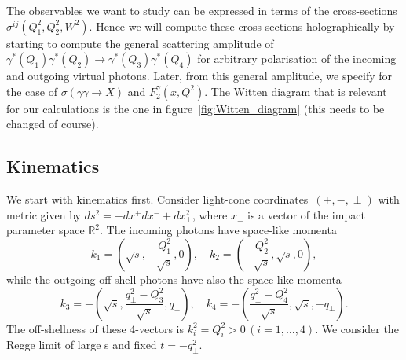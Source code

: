 \documentclass[preprint, 12pt]{elsarticle}
\begin{document}
The observables we want to study can be expressed in terms of the cross-sections $\sigma^{ij}\left(Q_1^2, Q_2^2, W^2\right)$. Hence we will compute these cross-sections holographically by starting to compute the general scattering amplitude of $\gamma^{*}\left(Q_1\right)\gamma^{*}\left(Q_2\right) \rightarrow \gamma^{*}\left(Q_3\right) \gamma^{*}\left(Q_4\right)$ for arbitrary polarisation of the incoming and outgoing virtual photons. Later, from this general amplitude, we specify for the case of $\sigma\left(\gamma \gamma \rightarrow X\right)$ and $F_2^\gamma\left(x, Q^2\right)$. The Witten diagram that is relevant for our calculations is the one in figure~\ref{fig:Witten_diagram} (this needs to be changed of course).

\subsection{Kinematics}
We start with kinematics first. Consider light-cone coordinates~$\left(+, -, \perp \right)$ with metric given by $ds^2 = - dx^{+} dx^{-} + d x_\perp^2$, where $x_\perp$ is a vector of the impact parameter space $\mathbb{R}^2$. The incoming photons have space-like momenta
\begin{equation}
k_1 = \left( \sqrt{s}, - \frac{Q_1^2}{\sqrt{s}}, 0 \right), \quad k_2 = \left( - \frac{Q_2^2}{\sqrt{s}}, \sqrt{s},  0 \right),
\end{equation}
while the outgoing off-shell photons have also the space-like momenta
\begin{equation}
k_3 = - \left( \sqrt{s},  \frac{q_\perp^2 - Q_3^2}{\sqrt{s}}, q_\perp \right), \quad k_4 = - \left(  \frac{q_\perp^2-Q_4^2}{\sqrt{s}}, \sqrt{s},  -q_\perp \right).
\end{equation}
The off-shellness of these 4-vectors is $k_i^2 = Q_i^2 > 0 \, \left( i = 1, \dots, 4\right)$. We consider the Regge limit of large s and fixed $t = -q_\perp^2$.
\end{document}
